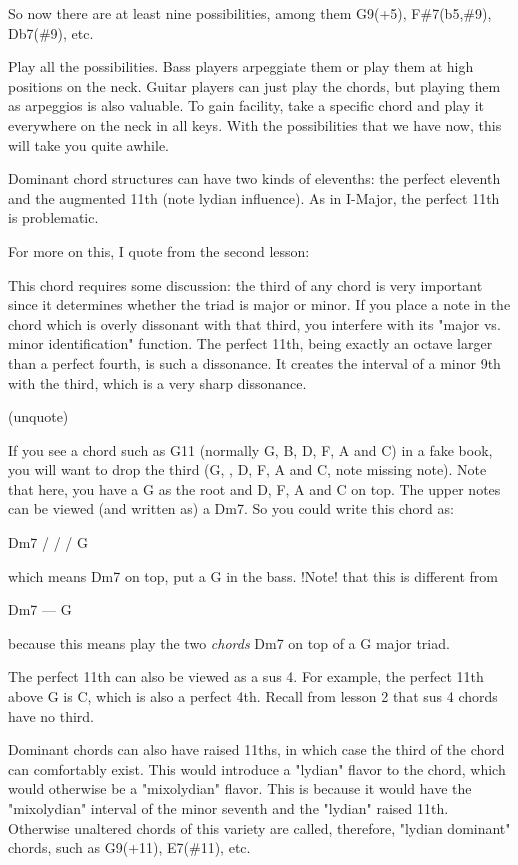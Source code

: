 So now there are at least nine possibilities, among them G9(+5), F\#7(b5,\#9),
Db7(\#9), etc.

Play all the possibilities. Bass players arpeggiate them or play them at high
positions on the neck. Guitar players can just play the chords, but playing
them as arpeggios is also valuable. To gain facility, take a specific chord
and play it everywhere on the neck in all keys. With the possibilities that
we have now, this will take you quite awhile.

Dominant chord structures can have two kinds of elevenths: the perfect
eleventh and the augmented 11th (note lydian influence). As in I-Major,
the perfect 11th is problematic.

For more on this, I quote from the second lesson:

This chord requires some discussion: the third of any chord is very
important since it determines whether the triad is major or minor.
If you place a note in the chord which is overly dissonant with that
third, you interfere with its "major vs. minor identification" function.
The perfect 11th, being exactly an octave larger than a perfect fourth,
is such a dissonance. It creates the interval of a minor 9th with the
third, which is a very sharp dissonance.

(unquote)

If you see a chord such as G11 (normally G, B, D, F, A and C) in a fake book,
you will want to drop the third (G,  , D, F, A and C, note missing note). Note 
that here, you have a G as the root and D, F, A and C on top. The upper notes 
can be viewed (and written as) a Dm7. So you could write this chord as:

                Dm7 /
                   /
                  /  G

which means Dm7 on top, put a G in the bass. !Note! that this is different from

              Dm7
              ---
               G

because this means play the two \emph{chords} Dm7 on top of a G major triad.

The perfect 11th can also be viewed as a sus 4. For example, the perfect 11th
above G is C, which is also a perfect 4th. Recall from lesson 2 that sus 4
chords have no third.

Dominant chords can also have raised 11ths, in which case the third of the
chord can comfortably exist. This would introduce a "lydian" flavor to the
chord, which would otherwise be a "mixolydian" flavor. This is because it
would have the "mixolydian" interval of the minor seventh and the "lydian"
raised 11th. Otherwise unaltered chords of this variety are called, therefore,
"lydian dominant" chords, such as G9(+11), E7(\#11), etc.

